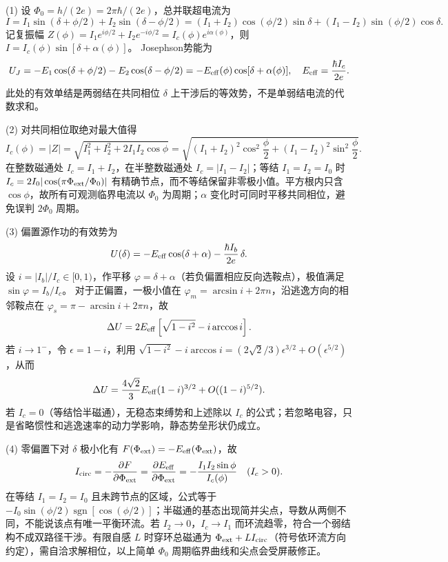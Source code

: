 (1) 设 \(\Phi_0=h/(2e)=2\pi\hbar/(2e)\)，总并联超电流为
\[
I=I_1\sin(\delta+\phi/2)+I_2\sin(\delta-\phi/2)
=(I_1+I_2)\cos(\phi/2)\sin\delta
+(I_1-I_2)\sin(\phi/2)\cos\delta.
\]
记复振幅
\(Z(\phi)=I_1e^{i\phi/2}+I_2e^{-i\phi/2}=I_c(\phi)e^{i\alpha(\phi)}\)，则
\(I=I_c(\phi)\sin[\delta+\alpha(\phi)]\)。
Josephson势能为
\[
U_J=-E_1\cos(\delta+\phi/2)-E_2\cos(\delta-\phi/2)
=-E_{\rm eff}(\phi)\cos[\delta+\alpha(\phi)],
\quad E_{\rm eff}=\frac{\hbar I_c}{2e}.
\]
此处的有效单结是两弱结在共同相位 \(\delta\) 上干涉后的等效势，不是单弱结电流的代数求和。

(2) 对共同相位取绝对最大值得
\[
I_c(\phi)=|Z|=\sqrt{I_1^2+I_2^2+2I_1I_2\cos\phi}
=\sqrt{(I_1+I_2)^2\cos^2\frac\phi2+
(I_1-I_2)^2\sin^2\frac\phi2}.
\]
在整数磁通处 \(I_c=I_1+I_2\)，在半整数磁通处
\(I_c=|I_1-I_2|\)；等结 \(I_1=I_2=I_0\) 时
\(I_c=2I_0|\cos(\pi\Phi_{\rm ext}/\Phi_0)|\) 有精确节点，而不等结保留非零极小值。平方根内只含 \(\cos\phi\)，故所有可观测临界电流以 \(\Phi_0\) 为周期；\(\alpha\) 变化时可同时平移共同相位，避免误判 \(2\Phi_0\) 周期。

(3) 偏置源作功的有效势为
\[
U(\delta)=-E_{\rm eff}\cos(\delta+\alpha)
-\frac{\hbar I_b}{2e}\,\delta.
\]
设 \(i=|I_b|/I_c\in[0,1)\)，作平移 \(\varphi=\delta+\alpha\)（若负偏置相应反向选鞍点），极值满足
\(\sin\varphi=I_b/I_c\)。
对于正偏置，一极小值在 \(\varphi_m=\arcsin i+2\pi n\)，沿逃逸方向的相邻鞍点在 \(\varphi_s=\pi-\arcsin i+2\pi n\)，故
\[
\Delta U=2E_{\rm eff}\left[\sqrt{1-i^2}-i\arccos i\right].
\]
若 \(i\to1^-\)，令 \(\epsilon=1-i\)，利用
\(\sqrt{1-i^2}-i\arccos i=(2\sqrt2/3)\epsilon^{3/2}+O(\epsilon^{5/2})\)，从而
\[
\Delta U=\frac{4\sqrt2}{3}E_{\rm eff}(1-i)^{3/2}
+O((1-i)^{5/2}).
\]
若 \(I_c=0\)（等结恰半磁通），无稳态束缚势和上述除以 \(I_c\) 的公式；若忽略电容，只是省略惯性和逃逸速率的动力学影响，静态势垒形状仍成立。

(4) 零偏置下对 \(\delta\) 极小化有 \(F(\Phi_{\rm ext})=-E_{\rm eff}(\Phi_{\rm ext})\)，故
\[
I_{\rm circ}=-\frac{\partial F}{\partial\Phi_{\rm ext}}
=\frac{\partial E_{\rm eff}}{\partial\Phi_{\rm ext}}
=-\frac{I_1I_2\sin\phi}{I_c(\phi)}
\quad (I_c>0).
\]
在等结 \(I_1=I_2=I_0\) 且未跨节点的区域，公式等于
\(-I_0\sin(\phi/2)\operatorname{sgn}[\cos(\phi/2)]\)；半磁通的基态出现简并尖点，导数从两侧不同，不能说该点有唯一平衡环流。若 \(I_2\to0\)，\(I_c\to I_1\) 而环流趋零，符合一个弱结构不成双路径干涉。有限自感 \(L\) 时穿环总磁通为 \(\Phi_{\rm ext}+LI_{\rm circ}\)（符号依环流方向约定），需自洽求解相位，以上简单 \(\Phi_0\) 周期临界曲线和尖点会受屏蔽修正。

